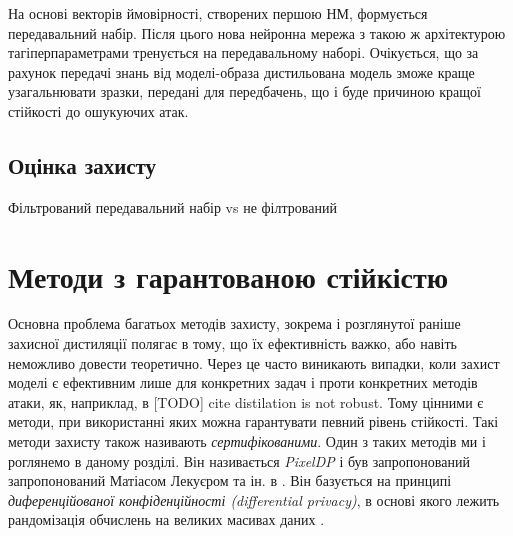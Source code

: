 \documentclass[14pt,a4paper]{extarticle}
\newcounter{e}
\numberwithin{equation}{section}
\numberwithin{figure}{section}
\begin{document}
 На основі векторів ймовірності, створених першою НМ, формується передавальний набір. Після цього нова нейронна мережа з такою ж архітектурою тагіперпараметрами тренується на передавальному наборі. Очікується, що за рахунок передачі знань від моделі-образа дистильована модель зможе краще узагальнювати зразки, передані для передбачень, що і буде причиною кращої стійкості до ошукуючих атак.
 
 

 
 \subsection{Оцінка захисту}
 
 Фільтрований передавальний набір vs не філтрований
 
 \newpage
 \thispagestyle{empty}
 \section{Методи з гарантованою стійкістю}
 Основна проблема багатьох методів захисту, зокрема і розглянутої раніше захисної дистиляції полягає в тому, що їх ефективність важко, або навіть неможливо довести теоретично. Через це часто виникають випадки, коли захист моделі є ефективним лише для конкретних задач і проти конкретних методів атаки,
 як, наприклад, в [TODO] cite distilation is not robust. Тому цінними є методи, при використанні яких можна гарантувати певний рівень стійкості. Такі методи захисту також називають \textit{сертифікованими}. Один з таких методів ми і роглянемо в даному розділі. Він називається \textit{PixelDP} і був запропонований  запропонований Матіасом Лекуєром та ін. в \cite{pixeldp}. Він базується на принципі \textit{диференційованої конфіденційності (differential privacy)}, в основі якого лежить рандомізація обчислень на великих масивах даних \cite{differential-privacy}.
 
\end{document}
